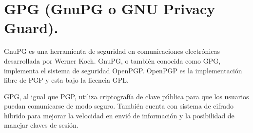 \section{GPG (GnuPG o GNU Privacy Guard).}
GnuPG es una herramienta de seguridad en comunicaciones electrónicas desarrollada por Werner Koch. GnuPG, o también conocida como GPG, implementa el sistema de seguridad OpenPGP. OpenPGP es la implementación libre de PGP y esta bajo la licencia GPL. 

GPG, al igual que PGP, utiliza criptografía de clave pública para que los usuarios puedan comunicarse de modo seguro. También cuenta con sistema de cifrado híbrido para mejorar la velocidad en envió de información y la posibilidad de manejar claves de sesión.\cite{gpg}
        
